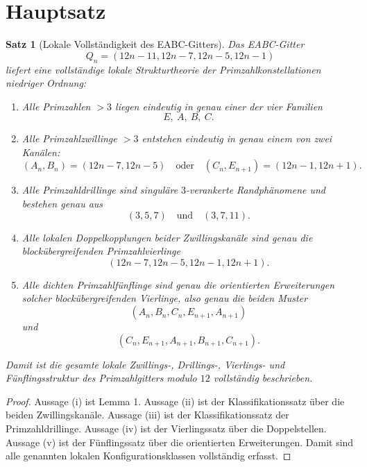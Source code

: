 \documentclass[11pt,a4paper]{article}
\newtheorem{satz}{Satz}
\theoremstyle{definition}
\theoremstyle{remark}
\begin{document}
	\section{Hauptsatz}
	
	\begin{satz}[Lokale Vollständigkeit des EABC-Gitters]
		Das EABC-Gitter
		\[
		Q_n=(12n-11,12n-7,12n-5,12n-1)
		\]
		liefert eine vollständige lokale Strukturtheorie der Primzahlkonstellationen niedriger Ordnung:
		
		\begin{enumerate}[label=\textup{(\roman*)}]
			\item Alle Primzahlen \(>3\) liegen eindeutig in genau einer der vier Familien
			\[
			E,\ A,\ B,\ C.
			\]
			
			\item Alle Primzahlzwillinge \(>3\) entstehen eindeutig in genau einem von zwei Kanälen:
			\[
			(A_n,B_n)=(12n-7,12n-5)
			\quad\text{oder}\quad
			(C_n,E_{n+1})=(12n-1,12n+1).
			\]
			
			\item Alle Primzahldrillinge sind singuläre \(3\)-verankerte Randphänomene und bestehen genau aus
			\[
			(3,5,7)
			\quad\text{und}\quad
			(3,7,11).
			\]
			
			\item Alle lokalen Doppelkopplungen beider Zwillingskanäle sind genau die blockübergreifenden
			Primzahlvierlinge
			\[
			(12n-7,12n-5,12n-1,12n+1).
			\]
			
			\item Alle dichten Primzahlfünflinge sind genau die orientierten Erweiterungen solcher
			blockübergreifenden Vierlinge, also genau die beiden Muster
			\[
			(A_n,B_n,C_n,E_{n+1},A_{n+1})
			\]
			und
			\[
			(C_n,E_{n+1},A_{n+1},B_{n+1},C_{n+1}).
			\]
		\end{enumerate}
		
		Damit ist die gesamte lokale Zwillings-, Drillings-, Vierlings- und Fünflingsstruktur des
		Primzahlgitters modulo \(12\) vollständig beschrieben.
	\end{satz}
	
	\begin{proof}
		Aussage \textup{(i)} ist Lemma 1. Aussage \textup{(ii)} ist der Klassifikationssatz über die
		beiden Zwillingskanäle. Aussage \textup{(iii)} ist der Klassifikationssatz der Primzahldrillinge.
		Aussage \textup{(iv)} ist der Vierlingssatz über die Doppelstellen. Aussage \textup{(v)} ist der
		Fünflingssatz über die orientierten Erweiterungen. Damit sind alle genannten lokalen
		Konfigurationsklassen vollständig erfasst.
	\end{proof}
	
\end{document}
